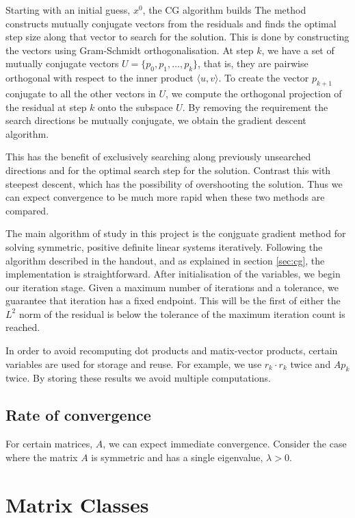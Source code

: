 Starting with an initial guess, $x^{0}$, the CG algorithm builds
The method constructs mutually conjugate vectors from the residuals and finds the optimal step size along that vector to search for the solution.
This is done by constructing the vectors using Gram-Schmidt orthogonalisation.
At step $k$, we have a set of mutually conjugate vectors $U=\{p_0, p_1,\ldots,p_k\}$, that is, they are pairwise orthogonal with respect to the inner product $\langle u,v \rangle$.
To create the vector $p_{k+1}$ conjugate to all the other vectors in $U$, we compute the orthogonal projection of the residual at step $k$ onto the subspace $U$.
By removing the requirement the search directions be mutually conjugate, we obtain the gradient descent algorithm.

This has the benefit of exclusively searching along previously unsearched directions and for the optimal search step for the solution.
Contrast this with steepest descent, which has the possibility of overshooting the solution.
Thus we can expect convergence to be much more rapid when these two methods are compared.


The main algorithm of study in this project is the conjguate gradient method for solving symmetric, positive definite linear systems iteratively.
Following the algorithm described in the handout, and as explained in section \ref{sec:cg}, the implementation is straightforward.
After initialisation of the variables, we begin our iteration stage. 
Given a maximum number of iterations and a tolerance, we guarantee that iteration has a fixed endpoint.
This will be the first of either the $L^{2}$ norm of the residual is below the tolerance of the maximum iteration count is reached.

In order to avoid recomputing dot products and matix-vector products, certain variables are used for storage and reuse.
For example, we use $r_k \cdot r_k$ twice and $A p_k$ twice. By storing these results we avoid multiple computations.


\subsection{Rate of convergence}

For certain matrices, $A$, we can expect immediate convergence.
Consider the case where the matrix $A$ is symmetric and has a single eigenvalue, $\lambda>0$.



\section{Matrix Classes}
\label{sec:classes}

